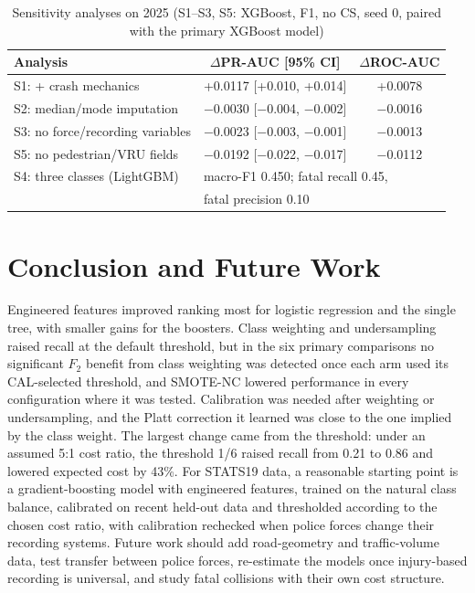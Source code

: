 \documentclass[conference,letterpaper]{IEEEtran}
\begin{document}
\begin{table}[t]
\centering
\caption{Sensitivity analyses on 2025 (S1--S3, S5: XGBoost, F1, no CS, seed 0, paired with the primary XGBoost model)}
\label{tab:sens}
\setlength{\tabcolsep}{3pt}
\begin{tabular}{@{}lcc@{}}
\toprule
Analysis & $\Delta$PR-AUC [95\% CI] & $\Delta$ROC-AUC \\
\midrule
S1: + crash mechanics & +0.0117 [+0.010, +0.014] & +0.0078 \\
S2: median/mode imputation & $-$0.0030 [$-$0.004, $-$0.002] & $-$0.0016 \\
S3: no force/recording variables & $-$0.0023 [$-$0.003, $-$0.001] & $-$0.0013 \\
S5: no pedestrian/VRU fields & $-$0.0192 [$-$0.022, $-$0.017] & $-$0.0112 \\
\midrule
S4: three classes (LightGBM) & \multicolumn{2}{l}{macro-F1 0.450; fatal recall 0.45,} \\
 & \multicolumn{2}{l}{fatal precision 0.10} \\
\bottomrule
\end{tabular}
\end{table}

\section{Conclusion and Future Work}

Engineered features improved ranking most for logistic regression and the single tree, with smaller gains for the boosters. Class weighting and undersampling raised recall at the default threshold, but in the six primary comparisons no significant $F_2$ benefit from class weighting was detected once each arm used its CAL-selected threshold, and SMOTE-NC lowered performance in every configuration where it was tested. Calibration was needed after weighting or undersampling, and the Platt correction it learned was close to the one implied by the class weight. The largest change came from the threshold: under an assumed 5:1 cost ratio, the threshold 1/6 raised recall from 0.21 to 0.86 and lowered expected cost by 43\%. For STATS19 data, a reasonable starting point is a gradient-boosting model with engineered features, trained on the natural class balance, calibrated on recent held-out data and thresholded according to the chosen cost ratio, with calibration rechecked when police forces change their recording systems. Future work should add road-geometry and traffic-volume data, test transfer between police forces, re-estimate the models once injury-based recording is universal, and study fatal collisions with their own cost structure.



\end{document}
